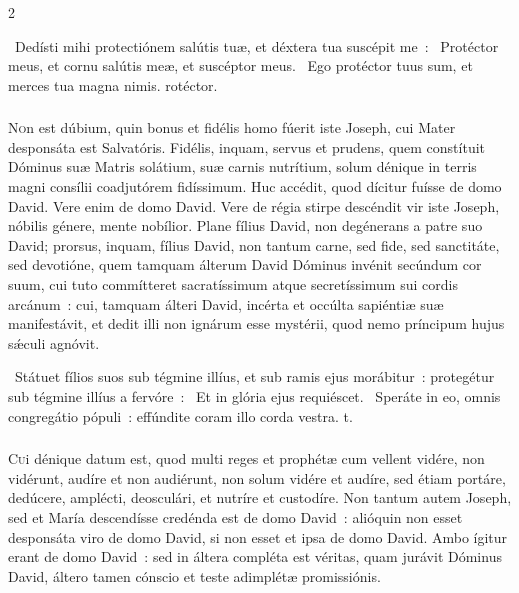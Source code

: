 \documentclass[9pt,twoside]{extarticle}
\begin{document}
\begin{multicols}{2}
{\begin{tightlist}{}
\item {}~Dedísti mihi protectiónem salútis tuæ, et déxtera tua suscépit me~: \textred{*}~Protéctor meus, et cornu salútis meæ, et suscéptor meus. ~Ego protéctor tuus sum, et merces tua magna nimis. rotéctor.
\end{tightlist}

\subsubsection*{\center {}}
\lettrine{N}on est dúbium, quin bonus et fidélis homo fúerit iste Joseph, cui Mater desponsáta est Salvatóris. Fidélis, inquam, servus et prudens, quem constítuit Dóminus suæ Matris solátium, suæ carnis nutrítium, solum dénique in terris magni consílii coadjutórem fidíssimum. Huc accédit, quod dícitur fuísse de domo David. Vere enim de domo David. Vere de régia stirpe descéndit vir iste Joseph, nóbilis génere, mente nobílior. Plane fílius David, non degénerans a patre suo David; prorsus, inquam, fílius David, non tantum carne, sed fide, sed sanctitáte, sed devotióne, quem tamquam álterum David Dóminus invénit secúndum cor suum, cui tuto commítteret sacratíssimum atque secretíssimum sui cordis arcánum~: cui, tamquam álteri David, incérta et occúlta sapiéntiæ suæ manifestávit, et dedit illi non ignárum esse mystérii, quod nemo príncipum hujus sǽculi agnóvit.

\begin{tightlist}{}
\item {}~Státuet fílios suos sub tégmine illíus, et sub ramis ejus morábitur~: protegétur sub tégmine illíus a fervóre~: \textred{*}~Et in glória ejus requiéscet. ~Speráte in eo, omnis congregátio pópuli~: effúndite coram illo corda vestra. t.
\end{tightlist}

\subsubsection*{\center {}}
\lettrine{C}ui dénique datum est, quod multi reges et prophétæ cum vellent vidére, non vidérunt, audíre et non audiérunt, non solum vidére et audíre, sed étiam portáre, dedúcere, amplécti, deosculári, et nutríre et custodíre. Non tantum autem Joseph, sed et María descendísse credénda est de domo David~: alióquin non esset desponsáta viro de domo David, si non esset et ipsa de domo David. Ambo ígitur erant de domo David~: sed in áltera compléta est véritas, quam jurávit Dóminus David, áltero tamen cónscio et teste adimplétæ promissiónis.

}
\end{multicols}
\end{document}
